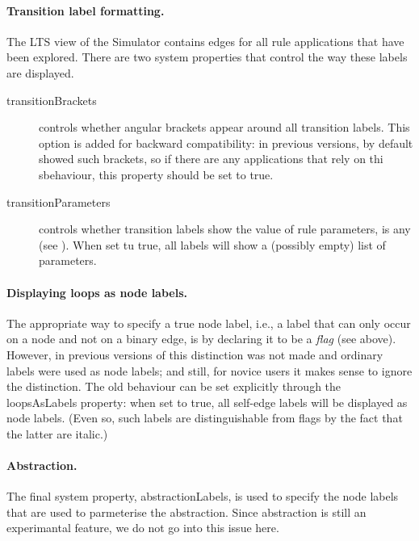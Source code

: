 \paragraph{Transition label formatting.}

The LTS view of the Simulator contains edges for all rule applications that
have been explored. There are two system properties that control the way these
labels are displayed.
\begin{description}
\item[\textsf{transitionBrackets}] controls whether angular brackets appear
  around all transition labels. This option is added for backward
  compatibility: in previous versions, \GROOVE{} by default showed such
  brackets, so if there are any applications that rely on thi sbehaviour, this
  property should be set to \textsf{true}.

\item[\textsf{transitionParameters}] controls whether transition labels
  show the value of rule parameters, is any (see ). When set
  tu \textsf{true}, all labels will show a (possibly empty) list of
  parameters.
\end{description}

\paragraph{Displaying loops as node labels.}

The appropriate way to specify a true node label, i.e., a label that can only
occur on a node and not on a binary edge, is by declaring it to be a
\emph{flag} (see above). However, in previous versions of \GROOVE this
distinction was not made and ordinary labels were used as node labels; and
still, for novice users it makes sense to ignore the distinction. The old
behaviour can be set explicitly through the \textsf{loopsAsLabels} property:
when set to \textsf{true}, all self-edge labels will be displayed as node
labels. (Even so, such labels are distinguishable from flags by the fact that
the latter are italic.)

\paragraph{Abstraction.}

The final system property, \textsf{abstractionLabels}, is used to specify the
node labels that are used to parmeterise the abstraction. Since abstraction is
still an experimantal feature, we do not go into this issue here.
